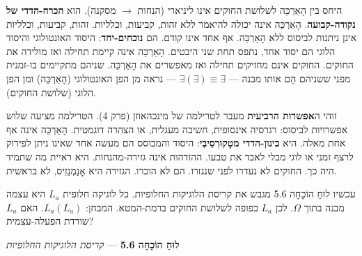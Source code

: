 \documentclass[10pt, openany, oneside]{book}
\begin{document}
היחס בין הָאַרְכֵּה לשלושת החוקים אינו ליניארי (הנחות $\to$ מסקנה). הוא \textbf{הכרח-הדדי של נקודה-קבועה}. הָאַרְכֵּה אינה יכולה להיאמר ללא זהות, קביעות, וכלליות. זהות, קביעות, וכלליות אינן ניתנות לביסוס ללא הָאַרְכֵּה. אף אחד אינו קודם. הם \textbf{נוכחים-יחד}: היסוד האונטולוגי והיסוד הלוגי הם יסוד אחד, נתפס תחת שני היבטים. הָאַרְכֵּה אינה קיימת תחילה ואז מולידה את החוקים. החוקים אינם מחזיקים תחילה ואז מאפשרים את הָאַרְכֵּה. שניהם מתקיימים בו-זמנית מפני ששניהם הֵם אותו מבנה — $\exists(\exists) \equiv \exists$ — נראה מן הפן האונטולוגי (הָאַרְכֵּה) ומן הפן הלוגי (שלושת החוקים).

זוהי ה\textbf{אפשרות הרביעית} מעבר לטרילמה של מינכהאוזן (פרק 4). הטרילמה מציעה שלוש אפשרויות לביסוס: רגרסיה אינסופית, חשיבה מעגלית, או הצהרה דוגמטית. הָאַרְכֵּה אינה אף אחת מאלה. היא \textbf{כינון-הדדי מטָקוּרְסִיבִי}: היסוד והמבוסס הם מעשה אחד שאינו ניתן לפירוק לרצף זמני או לוגי מבלי לאבד את טבעו. ההזדהות אינה גזירה-מהנחות. היא ראיית מה שתמיד היה כך. החוקים לא נעדרו לפני שנגזרו. הם לא הוכרו. הגזירה היא אָנַמְנֵזִיס, לא בראשית.

\vspace{1.5em}

עכשיו לוּחַ הוֹכָחָה 5.6 מגבש את קריסת הלוגיקות החלופיות. כל לוגיקה חלופית $L_a$ היא עצמה מבנה בתוך $\Omega$. לכן $L_a$ כפופה לשלושת החוקים ברמת-המטא. המבחן: $L_a(L_a)$. האם $L_a$ שורדת הפעלה-עצמית?

\vspace{0.5em}

\textbf{לוּחַ הוֹכָחָה 5.6} --- \textit{קריסת הלוגיקות החלופיות}

\vspace{0.5em}
\end{document}
